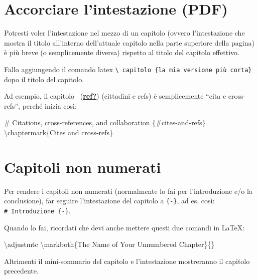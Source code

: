 \documentclass[a4paper, 11pt, nobind]{templates/ociamthesis}
\newenvironment{Shaded}{\begin{snugshade}}{\end{snugshade}}
\newcommand{\FunctionTok}[1]{\textcolor[rgb]{0.00,0.00,0.00}{#1}}
\newcommand{\NormalTok}[1]{#1}
\renewenvironment{Shaded}
{
  \vspace{10pt}%
  \begin{snugshade}%
}{%
  \end{snugshade}%
  \vspace{8pt}%
}
\begin{document}
\hypertarget{accorciare-lintestazione-pdf}{%
\section{Accorciare l'intestazione (PDF)}\label{accorciare-lintestazione-pdf}}

Potresti voler l'intestazione nel mezzo di un capitolo (ovvero l'intestazione che mostra il titolo all'interno dell'attuale capitolo nella parte superiore della pagina) è più breve (o semplicemente diversa) rispetto al titolo del capitolo effettivo.

Fallo aggiungendo il comando latex \texttt{\textbackslash{}\ capitolo\ \{la\ mia\ versione\ più\ corta\}} dopo il titolo del capitolo.

Ad esempio, il capitolo ~(\protect\hyperlink{ref-ref}{\textbf{ref?}}) (cittadini e refs) è semplicemente ``cita e cross-refs'', perché inizia così:

\begin{Shaded}
\begin{Highlighting}[]
\FunctionTok{\# Citations, cross{-}references, and collaboration \{\#cites{-}and{-}refs\} }
\NormalTok{\textbackslash{}chaptermark\{Cites and cross{-}refs\}}
\end{Highlighting}
\end{Shaded}

\hypertarget{capitoli-non-numerati}{%
\section{Capitoli non numerati}\label{capitoli-non-numerati}}

Per rendere i capitoli non numerati (normalmente lo fai per l'introduzione e/o la conclusione), far seguire l'intestazione del capitolo a \texttt{\{-\}}, ad es. così: \texttt{\#\ Introduzione\ \{-\}}.

Quando lo fai, ricordati che devi anche mettere questi due comandi in LaTeX:

\begin{Shaded}
\begin{Highlighting}[]
\FunctionTok{\textbackslash{}adjustmtc}
\FunctionTok{\textbackslash{}markboth}\NormalTok{\{The Name of Your Unnumbered Chapter\}\{\}}
\end{Highlighting}
\end{Shaded}

Altrimenti il mini-sommario del capitolo e l'intestazione mostreranno il capitolo precedente.
\end{document}
